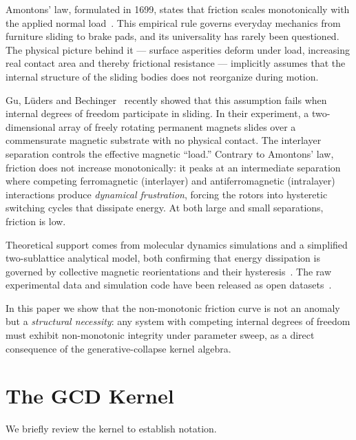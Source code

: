 \documentclass[
  aps,
  prd,
  twocolumn,
  superscriptaddress,
  nofootinbib,
  floatfix
]{revtex4-2}
\begin{document}
Amontons' law, formulated in 1699, states that friction scales
monotonically with the applied normal load~\cite{desplanques2015}.
This empirical rule governs everyday mechanics from furniture
sliding to brake pads, and its universality has rarely been
questioned.  The physical picture behind it --- surface
asperities deform under load, increasing real contact area
and thereby frictional resistance --- implicitly assumes
that the internal structure of the sliding bodies does not
reorganize during motion.

Gu, L\"uders and Bechinger~\cite{gu2026magnetic} recently
showed that this assumption fails when internal degrees of
freedom participate in sliding.  In their experiment, a
two-dimensional array of freely rotating permanent magnets
slides over a commensurate magnetic substrate with no
physical contact.  The interlayer separation controls the
effective magnetic ``load.''  Contrary to Amontons' law,
friction does not increase monotonically: it peaks
at an intermediate separation where competing ferromagnetic
(interlayer) and antiferromagnetic (intralayer) interactions
produce \emph{dynamical frustration}, forcing the rotors
into hysteretic switching cycles that dissipate energy.
At both large and small separations, friction is low.

Theoretical support comes from molecular dynamics
simulations and a simplified two-sublattice analytical
model, both confirming that energy dissipation is governed
by collective magnetic reorientations and their
hysteresis~\cite{gu2026magnetic,lueders2026code}.
The raw experimental data and simulation code have been
released as open datasets~\cite{gu2026data,lueders2026code}.

In this paper we show that the non-monotonic friction
curve is not an anomaly but a \emph{structural necessity}:
any system with competing internal degrees of freedom
must exhibit non-monotonic integrity under parameter sweep,
as a direct consequence of the generative-collapse kernel
algebra.

\section{The GCD Kernel}\label{sec:kernel}

We briefly review the kernel \cite{paulus2025umcp,paulus2025physicscoherence,%
paulus2026umcpcasepack} to establish notation.
\end{document}
